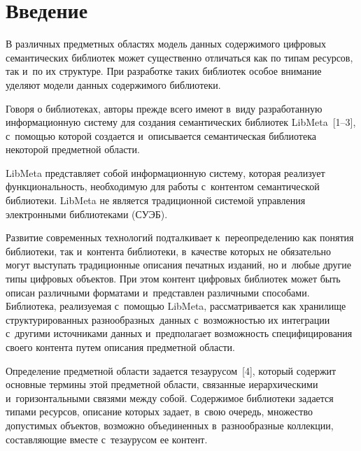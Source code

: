 
\thispagestyle{headings}

\begin{multicols}{2}

\label{st\stat}

\section{Введение}

     В различных предметных областях модель данных содержимого 
цифровых семантических биб\-лио\-тек может существенно отличаться как по 
типам ресурсов, так и~по их структуре. При разработке таких биб\-лио\-тек особое 
внимание уделяют модели данных содержимого биб\-лио\-теки.
     
     Говоря о библиотеках, авторы прежде всего \mbox{имеют} в~виду 
разработанную информационную сис\-те\-му для создания семантических 
библиотек LibMeta~[1--3], с~по\-мощью которой создается и~описывается 
семантическая биб\-лио\-те\-ка некоторой предметной об\-ласти. 
     
     LibMeta представляет собой информационную сис\-те\-му, которая 
реализует функциональность, необходимую для работы с~контентом 
семантической биб\-лио\-те\-ки. LibMeta не является традиционной сис\-те\-мой 
управления электронными библиотеками (СУЭБ). 

Развитие современных 
технологий подталкивает к~переопределению как понятия биб\-лио\-те\-ки, так 
и~контента биб\-лио\-те\-ки, в~качестве которых не обязательно могут выступать 
традиционные описания печатных изданий, но и~любые другие типы 
циф\-ро\-вых объектов. При этом контент циф\-ро\-вых биб\-лио\-тек может быть 
описан различными форматами и~пред\-став\-лен различными способами. 
Биб\-лио\-те\-ка, реализуемая с~помощью LibMeta, рассматривается как 
хранилище структурированных разнообразных\ данных с~воз\-мож\-ностью их 
интеграции с~другими источниками данных и~предполагает возможность 
специфицирования своего контента путем описания предметной об\-ласти. 
     
     Определение предметной области задается тезаурусом~[4], который 
содержит основные термины этой предметной об\-ласти, связанные 
иерархическими и~горизонтальными связями между собой. Содержимое 
биб\-лио\-те\-ки задается типами ресурсов, описание которых задает,
в~свою очередь, множество 
допустимых объектов, возможно объединенных в~разнообразные коллекции, 
со\-став\-ля\-ющие вместе с~тезаурусом ее контент.
     

\end{multicols}
